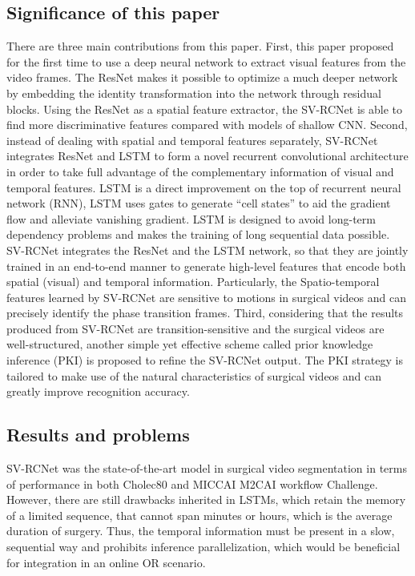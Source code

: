 \documentclass[11pt]{article} \usepackage[top=1in, bottom=1in, left=1in, right=1in]{geometry}
\begin{document}
\subsection{Significance of this paper}
There are three main contributions from this paper. First, this paper proposed for the first time to use a deep neural network to extract visual features from the video frames. The ResNet makes it possible to optimize a much deeper network by embedding the identity transformation into the network through residual blocks. Using the ResNet as a spatial feature extractor, the SV-RCNet is able to find more discriminative features compared with models of shallow CNN. Second, instead of dealing with spatial and temporal features separately, SV-RCNet integrates ResNet and LSTM to form a novel recurrent convolutional architecture in order to take full advantage of the complementary information of visual and temporal features. LSTM is a direct improvement on the top of recurrent neural network (RNN), LSTM uses gates to generate “cell states” to aid the gradient flow and alleviate vanishing gradient. LSTM is designed to avoid long-term dependency problems and makes the training of long sequential data possible. SV-RCNet integrates the ResNet and the LSTM network, so that they are jointly trained in an end-to-end manner to generate high-level features that encode both spatial (visual) and temporal information. Particularly, the Spatio-temporal features learned by SV-RCNet are sensitive to motions in surgical videos and can precisely identify the phase transition frames. Third, considering that the results produced from SV-RCNet are transition-sensitive and the surgical videos are well-structured, another simple yet effective scheme called prior knowledge inference (PKI) is proposed to refine the SV-RCNet output. The PKI strategy is tailored to make use of the natural characteristics of surgical videos and can greatly improve recognition accuracy.
\subsection{Results and problems}
SV-RCNet was the state-of-the-art model in surgical video segmentation in terms of performance in both Cholec80 and MICCAI M2CAI workflow Challenge. However, there are still drawbacks inherited in LSTMs, which retain the memory of a limited sequence, that cannot span minutes or hours, which is the average duration of surgery. Thus, the temporal information must be present in a slow, sequential way and prohibits inference parallelization, which would be beneficial for integration in an online OR scenario.
\end{document}
